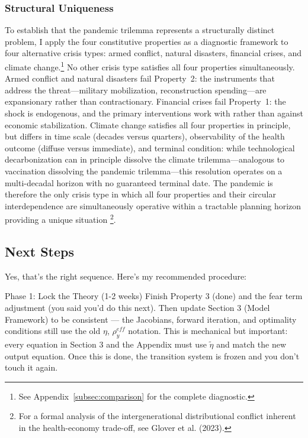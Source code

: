 \documentclass[12pt, a4paper]{article}
\begin{document}
\subsubsection*{Structural Uniqueness}

To establish that the pandemic trilemma represents a structurally distinct problem, I apply the four constitutive properties as a diagnostic framework to four alternative crisis types: armed conflict, natural disasters, financial crises, and climate change.\footnote{See Appendix~\ref{subsec:comparison} for the complete diagnostic.} No other crisis type satisfies all four properties simultaneously. Armed conflict and natural disasters fail Property~2: the instruments that address the threat---military mobilization, reconstruction spending---are expansionary rather than contractionary. Financial crises fail Property~1: the shock is endogenous, and the primary interventions work with rather than against economic stabilization. Climate change satisfies all four properties in principle, but differs in time scale (decades versus quarters), observability of the health outcome (diffuse versus immediate), and terminal condition: while technological decarbonization can in principle dissolve the climate trilemma---analogous to vaccination dissolving the pandemic trilemma---this resolution operates on a multi-decadal horizon with no guaranteed terminal date. The pandemic is therefore the only crisis type in which all four properties and their circular interdependence are simultaneously operative within a tractable planning horizon providing a unique situation \footnote{For a formal analysis of the intergenerational distributional conflict inherent in the
health-economy trade-off, see Glover et al. (2023).}.


\newpage
\subsection{Next Steps}
Yes, that's the right sequence. Here's my recommended procedure:

Phase 1: Lock the Theory (1-2 weeks)
Finish Property 3 (done) and the fear term adjustment (you said you'd do this next). Then update Section 3 (Model Framework) to be consistent — the Jacobians, forward iteration, and optimality conditions still use the old $\eta$, $\rho_y^{eff}$ notation. This is mechanical but important: every equation in Section 3 and the Appendix must use $\tilde{\eta}$ and match the new output equation. Once this is done, the transition system is frozen and you don't touch it again.
\end{document}
